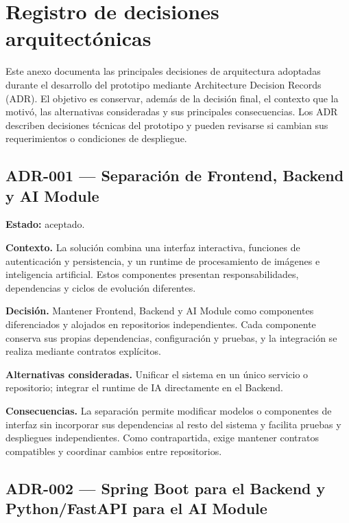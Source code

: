 \chapter{Registro de decisiones arquitectónicas}
\label{anexo:decisiones-arquitectonicas}

Este anexo documenta las principales decisiones de arquitectura adoptadas durante el desarrollo del prototipo mediante Architecture Decision Records (ADR). El objetivo es conservar, además de la decisión final, el contexto que la motivó, las alternativas consideradas y sus principales consecuencias. Los ADR describen decisiones técnicas del prototipo y pueden revisarse si cambian sus requerimientos o condiciones de despliegue.

\section*{ADR-001 --- Separación de Frontend, Backend y AI Module}
{}
\label{adr:001-separacion-componentes}

\textbf{Estado:} aceptado.

\textbf{Contexto.} La solución combina una interfaz interactiva, funciones de autenticación y persistencia, y un runtime de procesamiento de imágenes e inteligencia artificial. Estos componentes presentan responsabilidades, dependencias y ciclos de evolución diferentes.

\textbf{Decisión.} Mantener Frontend, Backend y AI Module como componentes diferenciados y alojados en repositorios independientes. Cada componente conserva sus propias dependencias, configuración y pruebas, y la integración se realiza mediante contratos explícitos.

\textbf{Alternativas consideradas.} Unificar el sistema en un único servicio o repositorio; integrar el runtime de IA directamente en el Backend.

\textbf{Consecuencias.} La separación permite modificar modelos o componentes de interfaz sin incorporar sus dependencias al resto del sistema y facilita pruebas y despliegues independientes. Como contrapartida, exige mantener contratos compatibles y coordinar cambios entre repositorios.

\section*{ADR-002 --- Spring Boot para el Backend y Python/FastAPI para el AI Module}
{}
\label{adr:002-spring-boot-fastapi}


